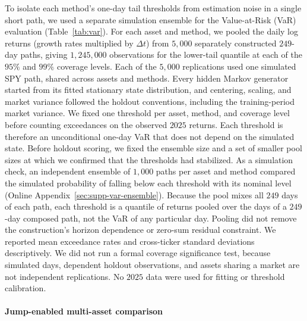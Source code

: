 To isolate each method's one-day tail thresholds from estimation
noise in a single short path, we used a separate simulation ensemble
for the Value-at-Risk (VaR) evaluation (Table~\ref{tab:var}). For each asset and method, we pooled the daily log returns (growth
rates multiplied by $\Delta t$) from $5{,}000$ separately constructed
$249$-day paths, giving $1{,}245{,}000$ observations for the lower-tail
quantile at each of the $95\%$ and $99\%$ coverage levels. Each of the $5{,}000$ replications used one simulated SPY path, shared
across assets and methods. Every hidden Markov generator started from
its fitted stationary state distribution, and centering, scaling, and market variance followed the holdout
conventions, including the training-period market variance. We fixed one threshold per asset, method, and
coverage level before counting exceedances on the observed $2025$ returns. Each threshold is therefore an
unconditional one-day VaR that does
not depend on the simulated state. Before holdout scoring, we fixed the ensemble size and a set of
smaller pool sizes at which we confirmed that the thresholds had
stabilized. As a simulation check, an independent ensemble of $1{,}000$
paths per asset and method compared the simulated probability of
falling below each threshold with its nominal level (Online
Appendix~\ref{sec:supp-var-ensemble}). Because the pool mixes all $249$ days of each path, each threshold is
a quantile of returns pooled over the days of a $249$-day composed
path, not the VaR of any particular day. Pooling did not remove the construction's horizon
dependence or zero-sum residual constraint. We reported mean
exceedance rates and cross-ticker standard deviations descriptively. We did not run a formal coverage
significance test, because
simulated days, dependent holdout observations, and assets sharing a
market are not independent replications. No $2025$ data were used for
fitting or threshold calibration.


\paragraph{Jump-enabled multi-asset comparison}

